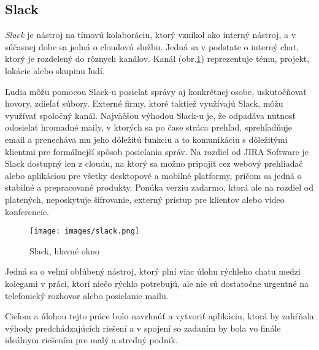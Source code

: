 \vspace{10pt}

\subsection{Slack}

\textit{Slack} je nástroj na tímovú kolaboráciu, ktorý vznikol ako interný nástroj, a v súčasnej dobe sa jedná o cloudovú službu. Jedná sa v podstate o interný chat, ktorý je rozdelený do rôznych kanálov. Kanál  (obr.\ref{obr2.2}) reprezentuje tému, projekt, lokácie alebo skupinu ľudí.


Ľudia môžu pomocou Slack-u posielať správy aj konkrétnej osobe, uskutočňovať hovory, zdieľať súbory. Externé firmy, ktoré taktiež využívajú Slack, môžu využívať spoločný kanál. Najväčšou výhodou Slack-u je, že odpadáva nutnosť odosielať hromadné maily, v ktorých sa po čase stráca prehľad, sprehľadňuje email a prenecháva mu jeho dôležitú funkciu a to  komunikáciu s  dôležitými klientmi pre formálnejší spôsob posielania správ. 
Na rozdiel od JIRA Software je Slack dostupný len z cloudu, na ktorý sa možno pripojiť cez webový prehliadač alebo aplikáciou pre všetky desktopové a mobilné platformy, pričom sa jedná o stabilné a prepracované produkty. Ponúka verziu zadarmo, ktorá ale na rozdiel od platených,  neposkytuje šifrovanie, externý prístup pre klientov alebo video konferencie.


\begin{figure}[H]
    \begin{center}
        \begin{minipage}{0.95\linewidth}
            \begin{center}
                \texttt{[image: images/slack.png]}
                \caption{Slack, hlavné okno}
                \label{obr2.2}
            \end{center}
        \end{minipage}
    \end{center}
\end{figure}
 
\vspace{10pt}
Jedná sa o veľmi obľúbený nástroj, ktorý plní viac úlohu rýchleho chatu medzi kolegami v práci, ktorí niečo rýchlo potrebujú, ale nie sú dostatočne urgentné na telefonický rozhovor alebo posielanie mailu. 
 


\vspace{10pt}

Cieľom a úlohou tejto práce bolo navrhnúť a vytvoriť aplikáciu, ktorá by zahŕňala výhody predchádzajúcich riešení a v spojení so zadaním by bola vo finále ideálnym riešením pre malý a stredný podnik.